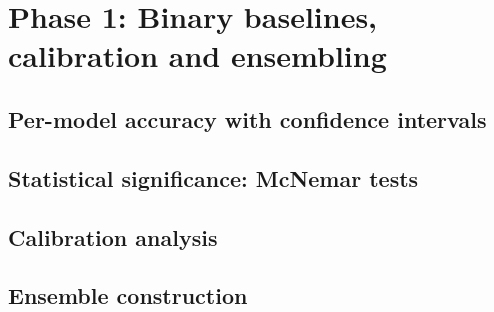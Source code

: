 \chapter{Phase 1: Binary baselines, calibration and ensembling}
\label{ch:phase1}


\section{Per-model accuracy with confidence intervals}
% 
%
%



\section{Statistical significance: McNemar tests}


\section{Calibration analysis}

\section{Ensemble construction}

